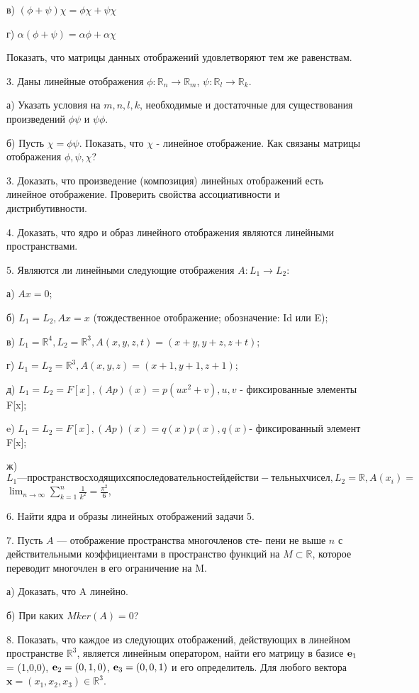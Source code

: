 \documentclass[12pt]{article}
\begin{document}
в) $(\phi + \psi)\chi = \phi\chi + \psi\chi$

г) $\alpha(\phi + \psi) = \alpha\phi + \alpha\chi$

Показать, что матрицы данных отображений удовлетворяют тем же равенствам.

3. Даны линейные отображения $\phi: \mathbb R_{n} \to \mathbb R_{m}$, $\psi: \mathbb R_{l} \to \mathbb R_{k}$.

а) Указать условия на $m, n, l, k$, необходимые и достаточные для существования произведений $\phi\psi$ и $\psi\phi$.

б) Пусть $\chi = \phi\psi$. Показать, что $\chi$ - линейное отображение. Как связаны матрицы отображения $\phi, \psi, \chi$?

3. Доказать, что произведение (композиция) линейных отображений есть линейное отображение. Проверить свойства ассоциативности и дистрибутивности.

4. Доказать, что ядро и образ линейного отображения являются линейными пространствами.

5. Являются ли линейными следующие отображения $A: L_{1} \to L_{2}:$

а) $Ax = 0$;

б) $L_1 = L_2, Ax = x$ (тождественное отображение; обозначение: Id или E);

в) $L_1 = \mathbb R^4, L_2 = \mathbb R^3, A(x,y,z,t) = (x+y, y+z, z+t)$;

г) $L_1 = L_2 = \mathbb R^3, A(x,y,z) = (x+1, y+1, z+1)$;

д) $L_1 = L_2 = F[x], (Ap)(x) = p(ux^2+v), u,v $ - фиксированные элементы F[x];

e) $L_1 = L_2 = F[x], (Ap)(x)= q(x)p(x), q(x) $- фиксированный элемент F[x];

ж) $L_1—пространство сходящихся последовательностей действи-
тельных чисел, L_2 = \mathbb R, A(x_i) = $$ \lim_{n \to \infty}
\sum_{k=1}^n \frac{1}{k^2}
= \frac{\pi^2}{6} $,

6. Найти ядра и образы линейных отображений задачи 5.

7. Пусть $A$ — отображение пространства многочленов сте-
пени не выше $n$ с действительными коэффициентами в пространство
функций на $M \subset \mathbb R$, которое переводит многочлен в его ограничение
на M. 

а) Доказать, что A линейно. 

б) При каких $M ker(A) = 0$?

8. Показать, что каждое из следующих отображений, действующих в линейном пространстве $\mathbb R^3$, является линейным оператором, найти его матрицу в базисе $\textbf e_1$ = (1,0,0), $\textbf e_2 = (0,1,0)$, $\textbf e_3 = (0,0,1)$ и его определитель. Для любого вектора $\textbf{x} = (x_1, x_2, x_3) \in \mathbb R^3$.
\end{document}
